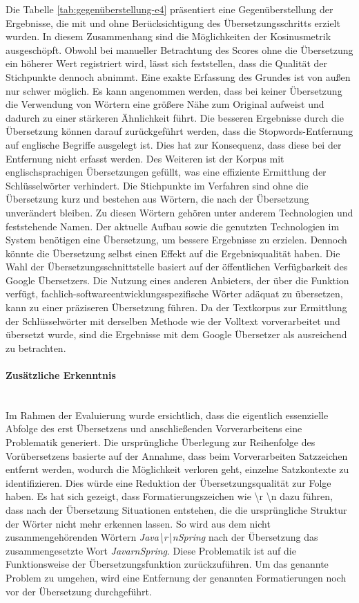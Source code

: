 Die Tabelle \ref{tab:gegenüberstellung-e4} präsentiert eine Gegenüberstellung der Ergebnisse, die mit und ohne Berücksichtigung des Übersetzungsschritts erzielt wurden. In diesem Zusammenhang sind die Möglichkeiten der Kosinusmetrik ausgeschöpft. Obwohl bei manueller Betrachtung des Scores ohne die Übersetzung ein höherer Wert registriert wird, lässt sich feststellen, dass die Qualität der Stichpunkte dennoch abnimmt. Eine exakte Erfassung des Grundes ist von außen nur schwer möglich. Es kann angenommen werden, dass bei keiner Übersetzung die Verwendung von Wörtern eine größere Nähe zum Original aufweist und dadurch zu einer stärkeren Ähnlichkeit führt. Die besseren Ergebnisse durch die Übersetzung können darauf zurückgeführt werden, dass die Stopwords-Entfernung auf englische Begriffe ausgelegt ist. Dies hat zur Konsequenz, dass diese bei der Entfernung nicht erfasst werden. Des Weiteren ist der Korpus mit englischsprachigen Übersetzungen gefüllt, was eine effiziente Ermittlung der Schlüsselwörter verhindert. Die Stichpunkte im Verfahren sind ohne die Übersetzung kurz und bestehen aus Wörtern, die nach der Übersetzung unverändert bleiben. Zu diesen Wörtern gehören unter anderem Technologien und feststehende Namen. Der aktuelle Aufbau sowie die genutzten Technologien im System benötigen eine Übersetzung, um bessere Ergebnisse zu erzielen. Dennoch könnte die Übersetzung selbst einen Effekt auf die Ergebnisqualität haben. Die Wahl der Übersetzungsschnittstelle basiert auf der öffentlichen Verfügbarkeit des Google Übersetzers. Die Nutzung eines anderen Anbieters, der über die Funktion verfügt, fachlich-softwareentwicklungsspezifische Wörter adäquat zu übersetzen, kann zu einer präziseren Übersetzung führen. Da der Textkorpus zur Ermittlung der Schlüsselwörter mit derselben Methode wie der Volltext vorverarbeitet und übersetzt wurde, sind die Ergebnisse mit dem Google Übersetzer als ausreichend zu betrachten.
\paragraph{Zusätzliche Erkenntnis}\mbox{}\\
Im Rahmen der Evaluierung wurde ersichtlich, dass die eigentlich essenzielle Abfolge des erst Übersetzens und anschließenden Vorverarbeitens eine Problematik generiert. Die ursprüngliche Überlegung zur Reihenfolge des Vorübersetzens basierte auf der Annahme, dass beim Vorverarbeiten Satzzeichen entfernt werden, wodurch die Möglichkeit verloren geht, einzelne Satzkontexte zu identifizieren. Dies würde eine Reduktion der Übersetzungsqualität zur Folge haben. Es hat sich gezeigt, dass Formatierungszeichen wie \textbackslash r \textbackslash n dazu führen, dass nach der Übersetzung Situationen entstehen, die die ursprüngliche Struktur der Wörter nicht mehr erkennen lassen. So wird aus dem nicht zusammengehörenden Wörtern \emph{Java\textbackslash r\textbackslash nSpring} nach der Übersetzung das zusammengesetzte Wort \emph{JavarnSpring}. Diese Problematik ist auf die Funktionsweise der Übersetzungsfunktion zurückzuführen. Um das genannte Problem zu umgehen, wird eine Entfernung der genannten Formatierungen noch vor der Übersetzung durchgeführt.\\

